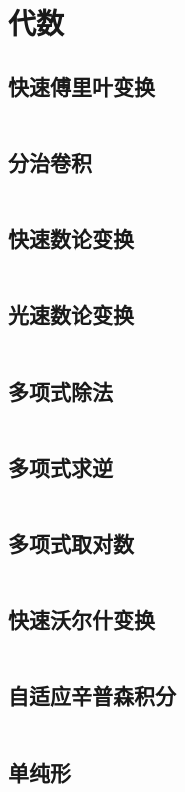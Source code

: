 \chapter{代数}
\section{快速傅里叶变换}
\inputminted{cpp}{\source/algebra/fast-fourier-transform.cpp}
\section{分治卷积}
\inputminted{cpp}{\source/algebra/cdq+fft.cpp}
\section{快速数论变换}
\inputminted{cpp}{\source/algebra/fast-numerical-transform.cpp}
\section{光速数论变换}
\inputminted{cpp}{\source/algebra/NTT+CRT.cpp}
\section{多项式除法}
\inputminted{cpp}{\source/algebra/polynomial-divide.cpp}
\section{多项式求逆}
\inputminted{cpp}{\source/algebra/polynomial-inverse.cpp}
\section{多项式取对数}
\inputminted{cpp}{\source/algebra/expandln.cpp}
\section{快速沃尔什变换}
\inputminted{cpp}{\source/algebra/FWT.cpp}
\section{自适应辛普森积分}
\inputminted{cpp}{\source/algebra/adaptive-simpsons-method.cpp}
\section{单纯形}
\inputminted{cpp}{\source/algebra/simplex.cpp}
